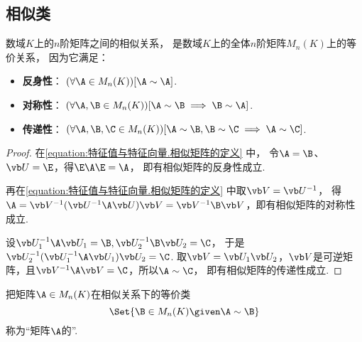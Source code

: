 \subsection{相似类}
\begin{property}\label{theorem:特征值与特征向量.相似关系是等价关系}
数域\(K\)上的\(n\)阶矩阵之间的相似关系，
是数域\(K\)上的全体\(n\)阶矩阵\(M_n(K)\)上的等价关系，
因为它满足：\begin{itemize}
	\item {\rm\bf 反身性}：
	\((\forall \A \in M_n(K))
	[\A\sim\A]\).

	\item {\rm\bf 对称性}：
	\((\forall \A,\B \in M_n(K))
	[\A \sim \B \implies \B \sim \A]\).

	\item {\rm\bf 传递性}：
	\((\forall \A,\B,\C \in M_n(K))
	[\A \sim \B, \B \sim \C \implies \A \sim \C]\).
\end{itemize}
\begin{proof}
在\cref{equation:特征值与特征向量.相似矩阵的定义} 中，
令\(\A=\B\)、\(\P=\E\)，得\(\E\A\E=\A\)，
即有相似矩阵的反身性成立.

再在\cref{equation:特征值与特征向量.相似矩阵的定义} 中取\(\Q=\P^{-1}\)，
得\(\A = \Q^{-1}(\P^{-1}\A\P)\Q = \Q^{-1}\B\Q\)，即有相似矩阵的对称性成立.

设\(\P_1^{-1}\A\P_1=\B,
\P_2^{-1}\B\P_2=\C\)，
于是\(\P_2^{-1}(\P_1^{-1}\A\P_1)\P_2=\C\).
取\(\Q=\P_1\P_2\)，\(\Q\)是可逆矩阵，且\(\Q^{-1}\A\Q=\C\)，所以\(\A\sim\C\)，
即有相似矩阵的传递性成立.
\end{proof}
\end{property}

\begin{definition}
把矩阵\(\A \in M_n(K)\)在相似关系下的等价类\[
	\Set{ \B \in M_n(K) \given \A\sim\B }
\]称为“矩阵\(\A\)的”.
\end{definition}

